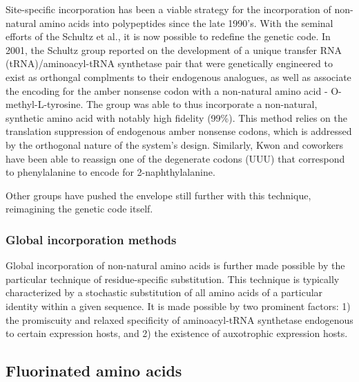
Site-specific incorporation has been a viable strategy for the incorporation of
non-natural amino acids into polypeptides since the late 1990's. With the
seminal efforts of the Schultz et al., it is now possible to redefine the
genetic code. In 2001, the Schultz group reported on the development of a unique
transfer RNA (tRNA)/aminoacyl-tRNA synthetase pair that were genetically
engineered to exist as orthongal complments to their endogenous analogues, as
well as associate the encoding for the amber nonsense codon with a non-natural
amino acid - O-methyl-L-tyrosine. The group was able to thus incorporate a
non-natural, synthetic amino acid with notably high fidelity
(99\%).\cite{Wang2001} This method relies on the translation suppression of
endogenous amber nonsense codons, which is addressed by the orthogonal nature of
the system's design. Similarly, Kwon and coworkers have been able to reassign
one of the degenerate codons (UUU) that correspond to phenylalanine to encode
for 2-naphthylalanine.\cite{Kwon2003}

Other groups have pushed the envelope still further with this technique,
reimagining the genetic code itself.

\subsubsection{Global incorporation methods} 


Global incorporation of non-natural amino acids is further made possible by the
particular technique of residue-specific substitution. This technique is
typically characterized by a stochastic substitution of all amino acids of a
particular identity within a given sequence. It is made possible by two
prominent factors: 1) the promiscuity and relaxed specificity of aminoacyl-tRNA
synthetase endogenous to certain expression hosts, and 2) the existence of
auxotrophic expression hosts.

\subsection{Fluorinated amino acids}



